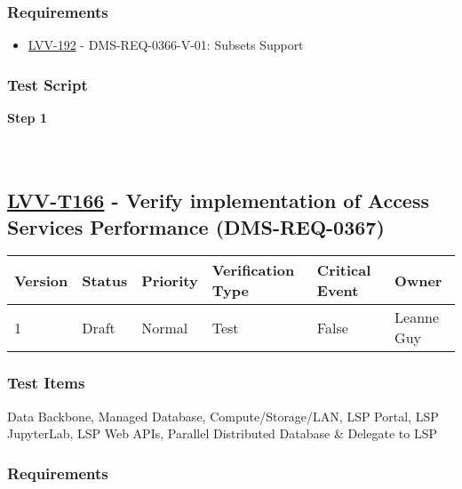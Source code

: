 \hypertarget{requirements-142}{%
\subsubsection{Requirements}\label{requirements-142}}

\begin{itemize}
\tightlist
\item
  \href{https://jira.lsstcorp.org/browse/LVV-192}{LVV-192} -
  DMS-REQ-0366-V-01: Subsets Support
\end{itemize}

\hypertarget{test-script-142}{%
\subsubsection{Test Script}\label{test-script-142}}

\textbf{Step 1}\\
~\\
~\\

\hypertarget{lvv-t166---verify-implementation-of-access-services-performance-dms-req-0367}{%
\subsection{\texorpdfstring{\href{https://jira.lsstcorp.org/secure/Tests.jspa\#/testCase/LVV-T166}{LVV-T166}
- Verify implementation of Access Services Performance
(DMS-REQ-0367)}{LVV-T166 - Verify implementation of Access Services Performance (DMS-REQ-0367)}}\label{lvv-t166---verify-implementation-of-access-services-performance-dms-req-0367}}

\begin{longtable}[]{@{}llllll@{}}
\toprule
Version & Status & Priority & Verification Type & Critical Event &
Owner\tabularnewline
\midrule
\endhead
1 & Draft & Normal & Test & False & Leanne Guy\tabularnewline
\bottomrule
\end{longtable}

\hypertarget{test-items-142}{%
\subsubsection{Test Items}\label{test-items-142}}

Data Backbone, Managed Database, Compute/Storage/LAN, LSP Portal, LSP
JupyterLab, LSP Web APIs, Parallel Distributed Database \& Delegate to
LSP

\hypertarget{requirements-143}{%
\subsubsection{Requirements}\label{requirements-143}}

